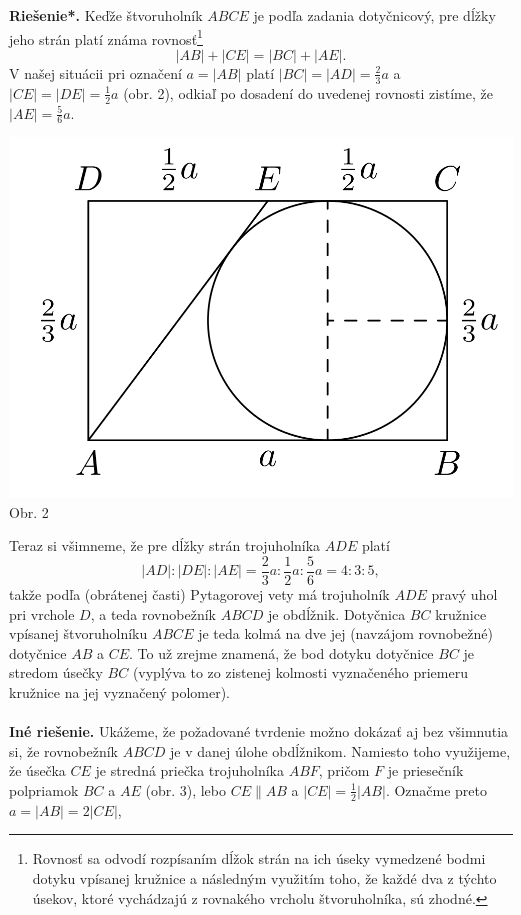 \documentclass[11pt,a4paper,oneside,final]{book}
\newcommand{\rieh}{\textbf{Riešenie*.} }
\begin{document}
\rieh Keďže štvoruholník $ABCE$ je podľa zadania dotyčnicový, pre dĺžky jeho strán platí známa rovnosť\footnote{Rovnosť sa odvodí rozpísaním dĺžok strán na ich úseky vymedzené bodmi dotyku vpísanej kružnice a následným využitím toho, že každé dva z týchto úsekov, ktoré vychádzajú z rovnakého vrcholu
štvoruholníka, sú zhodné.}
$$|AB| + |CE| = |BC| + |AE|.$$
V našej situácii pri označení $a = |AB|$ platí $|BC| = |AD| = \frac{2}{3}a$ a $|CE| = |DE| =\frac{1}{2}a$
(obr. 2), odkiaľ po dosadení do uvedenej rovnosti zistíme, že $|AE| = \frac{5}{6}a$.
\begin{center}
\includegraphics{61K31}\\

Obr. 2
\end{center}
Teraz si všimneme, že pre dĺžky strán trojuholníka $ADE$ platí
$$|AD| : |DE| : |AE| = \frac{2}{3}a : \frac{1}{2}a : \frac{5}{6}a = 4 : 3 : 5,$$
takže podľa (obrátenej časti) Pytagorovej vety má trojuholník $ADE$ pravý uhol pri vrchole $D$, a teda rovnobežník $ABCD$ je obdĺžnik. Dotyčnica $BC$ kružnice vpísanej štvoruholníku $ABCE$ je teda kolmá na dve jej (navzájom rovnobežné) dotyčnice $AB$ a $CE$. To už zrejme znamená, že bod dotyku dotyčnice $BC$ je stredom úsečky $BC$ (vyplýva to zo zistenej kolmosti vyznačeného priemeru kružnice na jej vyznačený
polomer).\\
\\
\textbf{Iné riešenie.} Ukážeme, že požadované tvrdenie možno dokázať aj bez všimnutia si, že rovnobežník $ABCD$ je v danej úlohe obdĺžnikom. Namiesto toho využijeme, že úsečka $CE$ je stredná priečka trojuholníka $ABF$, pričom $F$ je priesečník polpriamok $BC$ a $AE$ (obr. 3), lebo $CE \parallel AB$ a $|CE| =\frac{1}{2}|AB|$. Označme preto $a = |AB| = 2|CE|$,
\end{document}
